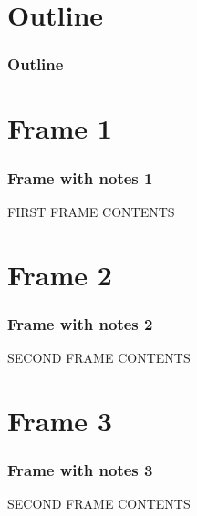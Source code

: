 \documentclass[handout]{beamer}
\begin{document}
\begin{frame}[plain]
    \titlepage  
{}
\end{frame}


\section*{Outline}
\begin{frame}[plain]
\frametitle{Outline}
    \tableofcontents

\end{frame}


\section{Frame 1}
\begin{frame}
\frametitle{Frame with notes 1}
    FIRST FRAME CONTENTS

\end{frame}


\section{Frame 2}
\begin{frame}
\frametitle{Frame with notes 2}
    SECOND FRAME CONTENTS
\end{frame}


\section{Frame 3}
\begin{frame}
    \frametitle{Frame with notes 3}
    SECOND FRAME CONTENTS
\end{frame}
\end{document}
